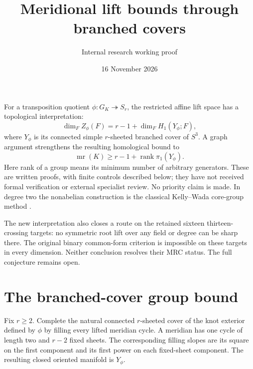 \documentclass[11pt]{article}
\title{Meridional lift bounds through branched covers}
\author{Internal research working proof}
\date{16 November 2026}
\newcommand{\mr}{\operatorname{mr}}
\newcommand{\rk}{\operatorname{rank}}
\begin{document}
\maketitle

For a transposition quotient $\phi:G_K\twoheadrightarrow S_r$, the
restricted affine lift space has a topological interpretation:
\[
 \dim_F Z_\phi(F)=r-1+\dim_F H_1(Y_\phi;F),
\]
where $Y_\phi$ is its connected simple $r$-sheeted branched cover of
$S^3$. A graph argument strengthens the resulting homological bound to
\[
                 \mr(K)\ge r-1+\rk\pi_1(Y_\phi).
\]
Here rank of a group means its minimum number of arbitrary generators.
These are written proofs, with finite controls described below; they
have not received formal verification or external specialist review.
No priority claim is made. In degree two the nonabelian construction is
the classical Kelly--Wada core-group method \cite{core}.

The new interpretation also closes a route on the retained sixteen
thirteen-crossing targets: no symmetric root lift over any field or
degree can be sharp there. The original binary common-form criterion
is impossible on these targets in every dimension. Neither conclusion
resolves their MRC status. The full conjecture remains open.

\section{The branched-cover group bound}

Fix $r\ge2$. Complete the natural connected $r$-sheeted cover of the
knot exterior defined by $\phi$ by filling every lifted meridian cycle.
A meridian has one cycle of length two and $r-2$ fixed sheets. The
corresponding filling slopes are its square on the first component and
its first power on each fixed-sheet component. The resulting closed
oriented manifold is $Y_\phi$.
\end{document}
